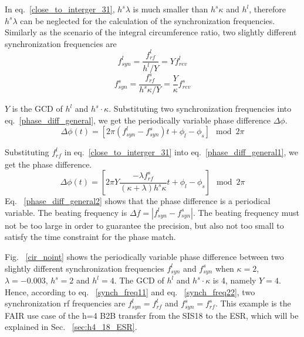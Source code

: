 In eq.~\ref{close_to_interger_31}, $h^s\lambda $ is much smaller than $h^s\kappa$ and $h^l$, therefore $h^s\lambda $ can be neglected  for the calculation of the synchronization frequencies. Similarly as the scenario of the integral circumference ratio, two slightly different synchronization frequencies are 
\begin{equation}
f_{\mathit{syn}}^{l}=\frac{f_{\mathit{rf}}^{l}}{h^{l}/Y}=Yf_{\mathit{rev}}^{l} \label{synch_freq11}
\end{equation}
\begin{equation}
f_{\mathit{syn}}^{s}=\frac{f_{\mathit{rf}}^{s}}{h^{s}\kappa/Y}=\frac{Y}{\kappa}f_{\mathit{rev}}^{s} \label{synch_freq22}
\end{equation}


$Y$ is the GCD of $h^l$ and $h^s \cdot \kappa$. Substituting two synchronization frequencies into eq.~\ref{phase_diff_general}, we get the periodically variable phase difference $\Delta \phi$.
\begin{equation}
	\Delta \phi(t)=[2\pi(f_{\mathit{syn}}^{l}-f_{\mathit{syn}}^{s})t+\phi_l-\phi_s] \mod 2\pi \label{phase_diff_general1}
\end{equation}

Substituting $f_{\mathit{rf}}^{l}$ in eq.~\ref{close_to_interger_31} into eq.~\ref{phase_diff_general1}, we get the phase difference.
\begin{equation}
	\Delta \phi(t)=[2\pi Y\frac{-{\lambda f_{\mathit{rf}}^{s}}}{(\kappa+\lambda)h^{s}\kappa}t+\phi_l-\phi_s] \mod 2\pi \label{phase_diff_general2}
\end{equation}
Eq. ~\ref{phase_diff_general2} shows that the phase difference is a periodical variable. The beating frequency is $\Delta f=|f_{\mathit{syn}}^{l}-f_{\mathit{syn}}^{s}|$. The beating frequency must not be too large in order to guarantee the precision, but also not too small to satisfy the time constraint for the phase match. 

Fig. ~\ref{cir_noint} shows the periodically variable phase difference between two slightly different synchronization frequencies $f_{\mathit{syn}}^{l}$ and $f_{\mathit{syn}}^{s}$ when $\kappa=2$, $\lambda=-0.003$, $h^s=2$ and $h^l=4$. The GCD of $h^l$ and $h^s \cdot \kappa$ is 4, namely $Y=4$. Hence, according to eq. ~\ref{synch_freq11} and eq. ~\ref{synch_freq22}, two synchronization rf frequencies are $f_{\mathit{syn}}^{l}=f_{\mathit{rf}}^{l}$ and $f_{\mathit{syn}}^{s}=f_{\mathit{rf}}^{s}$. This example is the FAIR use case of the h=4 B2B transfer from the SIS18 to the ESR, which will be explained in Sec. ~\ref{sec:h4_18_ESR}. 

